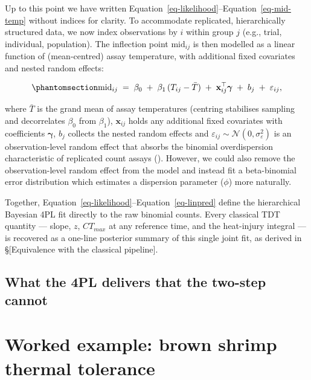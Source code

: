 \documentclass[
  11pt,
]{article}
\begin{document}
Up to this point we have written
Equation~\ref{eq-likelihood}--Equation~\ref{eq-mid-temp} without indices
for clarity. To accommodate replicated, hierarchically structured data,
we now index observations by \(i\) within group \(j\) (e.g., trial,
individual, population). The inflection point \(\text{mid}_{ij}\) is
then modelled as a linear function of (mean-centred) assay temperature,
with additional fixed covariates and nested random effects:

\begin{equation}\phantomsection\label{eq-linpred}{
\text{mid}_{ij} \;=\; \beta_0 \;+\; \beta_1\,(T_{ij} - \bar T) \;+\; \mathbf{x}_{ij}^{\top}\boldsymbol{\gamma} \;+\; b_{j} \;+\; \varepsilon_{ij},
}\end{equation}

where \(\bar T\) is the grand mean of assay temperatures (centring
stabilises sampling and decorrelates \(\beta_0\) from \(\beta_1\)),
\(\mathbf{x}_{ij}\) holds any additional fixed covariates with
coefficients \(\boldsymbol{\gamma}\), \(b_{j}\) collects the nested
random effects and
\(\varepsilon_{ij} \sim \mathcal{N}(0, \sigma_\varepsilon^2)\) is an
observation-level random effect that absorbs the binomial overdispersion
characteristic of replicated count assays
(). However, we could
also remove the observation-level random effect from the model and
instead fit a beta-binomial error distribution which estimates a
dispersion parameter (\(\phi\)) more naturally.

Together, Equation~\ref{eq-likelihood}--Equation~\ref{eq-linpred} define
the hierarchical Bayesian 4PL fit directly to the raw binomial counts.
Every classical TDT quantity --- slope, \(z\), \(CT_{max}\) at any
reference time, and the heat-injury integral --- is recovered as a
one-line posterior summary of this single joint fit, as derived in
§{[}Equivalence with the classical pipeline{]}.

\subsection{What the 4PL delivers that the two-step
cannot}\label{what-the-4pl-delivers-that-the-two-step-cannot}

\section{Worked example: brown shrimp thermal
tolerance}\label{worked-example-brown-shrimp-thermal-tolerance}
\end{document}
